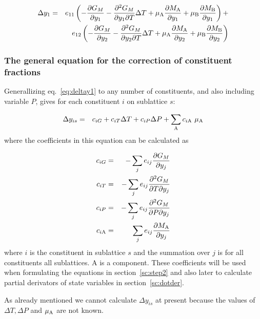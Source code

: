 \documentclass[12pt]{article}
\begin{document}
\begin{eqnarray}
\Delta y_{1} &=& e_{11}\left(-\frac{\partial G_M}{\partial y_{1}}
-\frac{\partial^2 G_M}{\partial y_{1}\partial T}\Delta T
+\mu_{\rm A}\frac{\partial M_{\rm A}}{\partial y_{1}} +
\mu_{\rm B}\frac{\partial M_{\rm B}}{\partial y_{1}}\right)+\nonumber\\&&
e_{12}\left(-\frac{\partial G_M}{\partial y_{2}}
-\frac{\partial^2 G_M}{\partial y_{2}\partial T}\Delta T
+\mu_{\rm A}\frac{\partial M_{\rm A}}{\partial y_{2}} +
\mu_{\rm B}\frac{\partial M_{\rm B}}{\partial y_{2}}\right)\label{eq:deltay1}
\end{eqnarray}

\subsubsection{The general equation for the correction of
constituent fractions}

Generallizing eq.~\ref{eq:deltay1} to any number of constituents, and
also including variable $P$, gives for each constituent $i$ on
sublattice $s$:

\begin{eqnarray}
\Delta y_{is}&=& c_{iG} + c_{iT}\Delta T + c_{iP}\Delta P +
\sum_{\rm A} c_{i{\rm A}}~\mu_{\rm A} \label{eq:deltay}
\end{eqnarray}
where the coefficients in this equation can be calculated as

\begin{eqnarray}
c_{iG} &=& -\sum_j e_{ij}
\frac{\partial G_M}{\partial y_{j}}\nonumber\\
c_{iT} &=& -\sum_j e_{ij}
\frac{\partial^2 G_M}{\partial T \partial y_{j}}\nonumber\\
c_{iP} &=& -\sum_j e_{ij}
\frac{\partial^2 G_M}{\partial P \partial y_{j}}\label{eq:defciz}\\
c_{i{\rm A}} &=& \sum_j e_{ij}
\frac{\partial M_{\rm A}}{\partial y_{j}}\nonumber
\end{eqnarray}
where $i$ is the constituent in sublattice $s$ and the summation over
$j$ is for all constituents all sublattices.  A is a component.  These
coefficients will be used when formulating the equations in
section~\ref{sc:step2} and also later to calculate partial
derivators of state variables in section~\ref{sc:dotder}.

As already mentioned we cannot calculate $\Delta y_{is}$ at present
because the values of $\Delta T, \Delta P$ and $\mu_{\rm A}$ are not
known.
\end{document}
